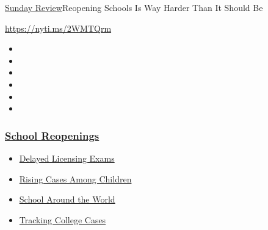 \href{/section/opinion/sunday}{Sunday Review}\textbar{}Reopening Schools
Is Way Harder Than It Should Be

\url{https://nyti.ms/2WMTQrm}

\begin{itemize}
\item
\item
\item
\item
\item
\item
\end{itemize}

\hypertarget{school-reopenings}{%
\subsubsection{\texorpdfstring{\href{https://www.nytimes3xbfgragh.onion/spotlight/schools-reopening?name=styln-coronavirus-schools-reopening\&region=TOP_BANNER\&block=storyline_menu_recirc\&action=click\&pgtype=Article\&impression_id=fd8afb90-f1da-11ea-8f23-d7c3eb3f6df2\&variant=undefined}{School
Reopenings}}{School Reopenings}}\label{school-reopenings}}

\begin{itemize}
\tightlist
\item
  \href{https://www.nytimes3xbfgragh.onion/2020/09/04/us/bar-exam-coronavirus.html?name=styln-coronavirus-schools-reopening\&region=TOP_BANNER\&block=storyline_menu_recirc\&action=click\&pgtype=Article\&impression_id=fd8afb91-f1da-11ea-8f23-d7c3eb3f6df2\&variant=undefined}{Delayed
  Licensing Exams}
\item
  \href{https://www.nytimes3xbfgragh.onion/interactive/2020/08/31/us/coronavirus-cases-children.html?name=styln-coronavirus-schools-reopening\&region=TOP_BANNER\&block=storyline_menu_recirc\&action=click\&pgtype=Article\&impression_id=fd8afb92-f1da-11ea-8f23-d7c3eb3f6df2\&variant=undefined}{Rising
  Cases Among Children}
\item
  \href{https://www.nytimes3xbfgragh.onion/2020/09/01/world/schools-reopen-globe-students.html?name=styln-coronavirus-schools-reopening\&region=TOP_BANNER\&block=storyline_menu_recirc\&action=click\&pgtype=Article\&impression_id=fd8afb93-f1da-11ea-8f23-d7c3eb3f6df2\&variant=undefined}{School
  Around the World}
\item
  \href{https://www.nytimes3xbfgragh.onion/interactive/2020/us/covid-college-cases-tracker.html?name=styln-coronavirus-schools-reopening\&region=TOP_BANNER\&block=storyline_menu_recirc\&action=click\&pgtype=Article\&impression_id=fd8afb94-f1da-11ea-8f23-d7c3eb3f6df2\&variant=undefined}{Tracking
  College Cases}
\end{itemize}

